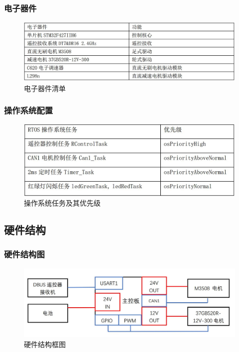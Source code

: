 \documentclass[12pt]{article}
\begin{document}
\begin{CJK}{UTF8}{song}
\subsubsection{电子器件}
 \begin{figure}[H]
\centering
\includegraphics[width=.9\textwidth]{chap5//fig2.jpg}
\caption{电子器件清单}
\end{figure}
\subsubsection{操作系统配置}
 \begin{figure}[H]
\centering
\includegraphics[width=.77\textwidth]{chap5//fig3.jpg}
\caption{操作系统任务及其优先级}
\end{figure}

\subsection{硬件结构}
\subsubsection{硬件结构图}
 \begin{figure}[H]
\centering
\includegraphics[width=.95\textwidth]{chap5//fig4.jpg}
\caption{硬件结构框图}
\end{figure}

\end{CJK}
\end{document}
